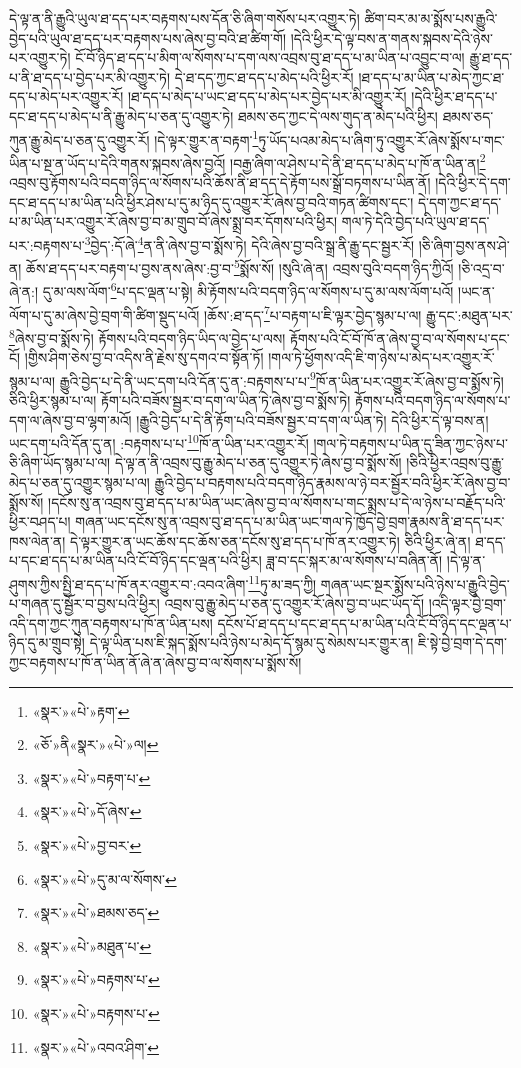 དེ་ལྟ་ན་ནི་རྒྱུའི་ཡུལ་ཐ་དད་པར་བརྟགས་པས་དོན་ཅི་ཞིག་གསོས་པར་འགྱུར་ཏེ། ཚིག་བར་མ་མ་སྨོས་པས་རྒྱུའི་བྱེད་པའི་ཡུལ་ཐ་དད་པར་བརྟགས་པས་ཞེས་བྱ་བའི་ཐ་ཚིག་གོ། །དེའི་ཕྱིར་དེ་ལྟ་བས་ན་གནས་སྐབས་དེའི་ཉེས་པར་འགྱུར་ཏེ། ངོ་བོ་ཉིད་ཐ་དད་པ་མིག་ལ་སོགས་པ་དག་ལས་འབྲས་བུ་ཐ་དད་པ་མ་ཡིན་པ་འབྱུང་བ་ལ། རྒྱུ་ཐ་དད་པ་ནི་ཐ་དད་པ་བྱེད་པར་མི་འགྱུར་ཏེ། དེ་ཐ་དད་ཀྱང་ཐ་དད་པ་མེད་པའི་ཕྱིར་རོ། །ཐ་དད་པ་མ་ཡིན་པ་མེད་ཀྱང་ཐ་དད་པ་མེད་པར་འགྱུར་རོ། །ཐ་དད་པ་མེད་པ་ཡང་ཐ་དད་པ་མེད་པར་བྱེད་པར་མི་འགྱུར་རོ། །དེའི་ཕྱིར་ཐ་དད་པ་དང་ཐ་དད་པ་མེད་པ་ནི་རྒྱུ་མེད་པ་ཅན་དུ་འགྱུར་ཏེ། ཐམས་ཅད་ཀྱང་དེ་ལས་གུད་ན་མེད་པའི་ཕྱིར། ཐམས་ཅད་ཀུན་རྒྱུ་མེད་པ་ཅན་དུ་འགྱུར་རོ། །དེ་ལྟར་གྱུར་ན་བརྟག་\footnote{«སྣར་»«པེ་»རྟག་}ཏུ་ཡོད་པའམ་མེད་པ་ཞིག་ཏུ་འགྱུར་རོ་ཞེས་སྨོས་པ་གང་ཡིན་པ་སྔ་ན་ཡོད་པ་དེའི་གནས་སྐབས་ཞེས་བྱའོ། །བརྒྱ་ཞིག་ལ་ཤེས་པ་དེ་ནི་ཐ་དད་པ་མེད་པ་ཁོ་ན་ཡིན་ན།\footnote{«ཅོ་»ནི«སྣར་»«པེ་»ལ།} འབྲས་བུ་རྟོགས་པའི་བདག་ཉིད་ལ་སོགས་པའི་ཆོས་ནི་ཐ་དད་དེ་རྟོག་པས་སྒྲོ་བཏགས་པ་ཡིན་ནོ། །དེའི་ཕྱིར་དེ་དག་དང་ཐ་དད་པ་མ་ཡིན་པའི་ཕྱིར་ཤེས་པ་དུ་མ་ཉིད་དུ་འགྱུར་རོ་ཞེས་བྱ་བའི་གཏན་ཚིགས་དང་། དེ་དག་ཀྱང་ཐ་དད་པ་མ་ཡིན་པར་འགྱུར་རོ་ཞེས་བྱ་བ་མ་གྲུབ་བོ་ཞེས་སྨྲ་བར་དོགས་པའི་ཕྱིར། གལ་ཏེ་དེའི་བྱེད་པའི་ཡུལ་ཐ་དད་པར་:བརྟགས་པ་\footnote{«སྣར་»«པེ་»བརྟག་པ་}བྱེད་:དོ་ཞེ་\footnote{«སྣར་»«པེ་»དོ་ཞེས་}ན་ནི་ཞེས་བྱ་བ་སྨོས་ཏེ། དེའི་ཞེས་བྱ་བའི་སྒྲ་ནི་རྒྱུ་དང་སྦྱར་རོ། །ཅི་ཞིག་བྱས་ནས་ཤེ་ན། ཆོས་ཐ་དད་པར་བརྟག་པ་བྱས་ནས་ཞེས་:བྱ་བ་\footnote{«སྣར་»«པེ་»བྱ་བར་}སྨོས་སོ། །སུའི་ཞེ་ན། འབྲས་བུའི་བདག་ཉིད་ཀྱིའོ། །ཅི་འདྲ་བ་ཞེ་ན:། དུ་མ་ལས་ལོག་\footnote{«སྣར་»«པེ་»དུ་མ་ལ་སོགས་}པ་དང་ལྡན་པ་སྟེ། མི་རྟོགས་པའི་བདག་ཉིད་ལ་སོགས་པ་དུ་མ་ལས་ལོག་པའོ། །ཡང་ན་ལོག་པ་དུ་མ་ཞེས་བྱེ་བྲག་གི་ཚིག་སྡུད་པའོ། །ཆོས་:ཐ་དད་\footnote{«སྣར་»«པེ་»ཐམས་ཅད་}པ་བརྟག་པ་ཇི་ལྟར་བྱེད་སྙམ་པ་ལ། རྒྱུ་དང་:མཐུན་པར་\footnote{«སྣར་»«པེ་»མཐུན་པ་}ཞེས་བྱ་བ་སྨོས་ཏེ། རྟོགས་པའི་བདག་ཉིད་ཡིད་ལ་བྱེད་པ་ལས། རྟོགས་པའི་ངོ་བོ་ཁོ་ན་ཞེས་བྱ་བ་ལ་སོགས་པ་དང་ངོ། །གྱིས་ཤིག་ཅེས་བྱ་བ་འདིས་ནི་རྗེས་སུ་དགའ་བ་སྟོན་ཏོ། །གལ་ཏེ་ཕྱོགས་འདི་ཇི་ག་ཉེས་པ་མེད་པར་འགྱུར་རོ་སྙམ་པ་ལ། རྒྱུའི་བྱེད་པ་དེ་ནི་ཡང་དག་པའི་དོན་དུ་ན་:བརྟགས་པ་པ་\footnote{«སྣར་»«པེ་»བརྟགས་པ་}ཁོ་ན་ཡིན་པར་འགྱུར་རོ་ཞེས་བྱ་བ་སྨོས་ཏེ། ཅིའི་ཕྱིར་སྙམ་པ་ལ། རྟོག་པའི་བཟོས་སྦྱར་བ་དག་ལ་ཡིན་ཏེ་ཞེས་བྱ་བ་སྨོས་ཏེ། རྟོགས་པའི་བདག་ཉིད་ལ་སོགས་པ་དག་ལ་ཞེས་བྱ་བ་ལྷག་མའོ། །རྒྱུའི་བྱེད་པ་དེ་ནི་རྟོག་པའི་བཟོས་སྦྱར་བ་དག་ལ་ཡིན་ཏེ། དེའི་ཕྱིར་དེ་ལྟ་བས་ན། ཡང་དག་པའི་དོན་དུ་ན། :བརྟགས་པ་པ་\footnote{«སྣར་»«པེ་»བརྟགས་པ་}ཁོ་ན་ཡིན་པར་འགྱུར་རོ། །གལ་ཏེ་བརྟགས་པ་ཡིན་དུ་ཟིན་ཀྱང་ཉེས་པ་ཅི་ཞིག་ཡོད་སྙམ་པ་ལ། དེ་ལྟ་ན་ནི་འབྲས་བུ་རྒྱུ་མེད་པ་ཅན་དུ་འགྱུར་ཏེ་ཞེས་བྱ་བ་སྨོས་སོ། །ཅིའི་ཕྱིར་འབྲས་བུ་རྒྱུ་མེད་པ་ཅན་དུ་འགྱུར་སྙམ་པ་ལ། རྒྱུའི་བྱེད་པ་བརྟགས་པའི་བདག་ཉིད་རྣམས་ལ་ཉེ་བར་སྦྱོར་བའི་ཕྱིར་རོ་ཞེས་བྱ་བ་སྨོས་སོ། །དངོས་སུ་ན་འབྲས་བུ་ཐ་དད་པ་མ་ཡིན་ཡང་ཞེས་བྱ་བ་ལ་སོགས་པ་གང་སྨྲས་པ་དེ་ལ་ཉེས་པ་བརྗོད་པའི་ཕྱིར་བཤད་པ། གཞན་ཡང་དངོས་སུ་ན་འབྲས་བུ་ཐ་དད་པ་མ་ཡིན་ཡང་གལ་ཏེ་ཁྱོད་བྱེ་བྲག་རྣམས་ནི་ཐ་དད་པར་ཁས་ལེན་ན། དེ་ལྟར་གྱུར་ན་ཡང་ཆོས་དང་ཆོས་ཅན་དངོས་སུ་ཐ་དད་པ་ཁོ་ནར་འགྱུར་ཏེ། ཅིའི་ཕྱིར་ཞེ་ན། ཐ་དད་པ་དང་ཐ་དད་པ་མ་ཡིན་པའི་ངོ་བོ་ཉིད་དང་ལྡན་པའི་ཕྱིར། ཟླ་བ་དང་སྐར་མ་ལ་སོགས་པ་བཞིན་ནོ། །དེ་ལྟ་ན་ཤུགས་ཀྱིས་སྤྱི་ཐ་དད་པ་ཁོ་ནར་འགྱུར་བ་:འབའ་ཞིག་\footnote{«སྣར་»«པེ་»འབའ་ཤིག་}ཏུ་མ་ཟད་ཀྱི། གཞན་ཡང་སྔར་སྨོས་པའི་ཉེས་པ་རྒྱུའི་བྱེད་པ་གཞན་དུ་སྦྱོར་བ་བྱས་པའི་ཕྱིར། འབྲས་བུ་རྒྱུ་མེད་པ་ཅན་དུ་འགྱུར་རོ་ཞེས་བྱ་བ་ཡང་ཡོད་དོ། །འདི་ལྟར་བྱེ་བྲག་འདི་དག་ཀྱང་ཀུན་བརྟགས་པ་ཁོ་ན་ཡིན་པས། དངོས་པོ་ཐ་དད་པ་དང་ཐ་དད་པ་མ་ཡིན་པའི་ངོ་བོ་ཉིད་དང་ལྡན་པ་ཉིད་དུ་མ་གྲུབ་སྟེ། དེ་ལྟ་ཡིན་པས་ཇི་སྐད་སྨོས་པའི་ཉེས་པ་མེད་དོ་སྙམ་དུ་སེམས་པར་གྱུར་ན། ཇི་སྟེ་བྱེ་བྲག་དེ་དག་ཀྱང་བརྟགས་པ་ཁོ་ན་ཡིན་ནོ་ཞེ་ན་ཞེས་བྱ་བ་ལ་སོགས་པ་སྨོས་སོ། 